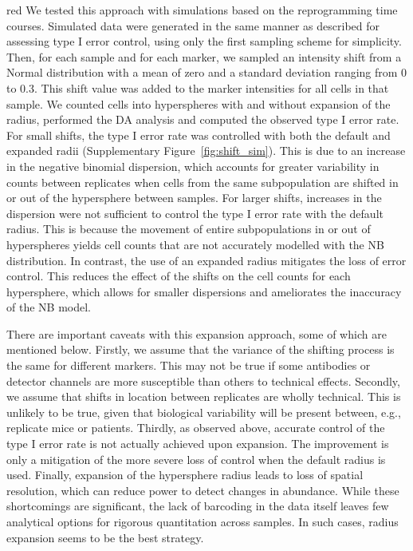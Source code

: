 \documentclass{article}
\begin{document}
\begin{color}{red}
We tested this approach with simulations based on the reprogramming time courses.
Simulated data were generated in the same manner as described for assessing type I error control, using only the first sampling scheme for simplicity.
Then, for each sample and for each marker, we sampled an intensity shift from a Normal distribution with a mean of zero and a standard deviation ranging from 0 to 0.3.
This shift value was added to the marker intensities for all cells in that sample.
We counted cells into hyperspheres with and without expansion of the radius, performed the DA analysis and computed the observed type I error rate.
For small shifts, the type I error rate was controlled with both the default and expanded radii (Supplementary Figure~\ref{fig:shift_sim}).
This is due to an increase in the negative binomial dispersion, which accounts for greater variability in counts between replicates when cells from the same subpopulation are shifted in or out of the hypersphere between samples. 
For larger shifts, increases in the dispersion were not sufficient to control the type I error rate with the default radius.
This is because the movement of entire subpopulations in or out of hyperspheres yields cell counts that are not accurately modelled with the NB distribution.
In contrast, the use of an expanded radius mitigates the loss of error control.
This reduces the effect of the shifts on the cell counts for each hypersphere, which allows for smaller dispersions and ameliorates the inaccuracy of the NB model.

There are important caveats with this expansion approach, some of which are mentioned below.
Firstly, we assume that the variance of the shifting process is the same for different markers.
This may not be true if some antibodies or detector channels are more susceptible than others to technical effects.
Secondly, we assume that shifts in location between replicates are wholly technical.
This is unlikely to be true, given that biological variability will be present between, e.g., replicate mice or patients.
Thirdly, as observed above, accurate control of the type I error rate is not actually achieved upon expansion.
The improvement is only a mitigation of the more severe loss of control when the default radius is used.
Finally, expansion of the hypersphere radius leads to loss of spatial resolution, which can reduce power to detect changes in abundance.
While these shortcomings are significant, the lack of barcoding in the data itself leaves few analytical options for rigorous quantitation across samples.
In such cases, radius expansion seems to be the best strategy.
\end{color}
\end{document}
